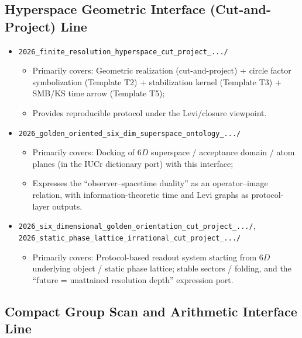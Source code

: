 \subsection{Hyperspace Geometric Interface (Cut-and-Project) Line}

\begin{itemize}
  \item \texttt{2026\_finite\_resolution\_hyperspace\_cut\_project\_.../}
  \begin{itemize}
    \item Primarily covers: Geometric realization (cut-and-project) + circle factor symbolization (Template T2) + stabilization kernel (Template T3) + SMB/KS time arrow (Template T5);
    \item Provides reproducible protocol under the Levi/closure viewpoint.
  \end{itemize}

  \item \texttt{2026\_golden\_oriented\_six\_dim\_superspace\_ontology\_.../}
  \begin{itemize}
    \item Primarily covers: Docking of $6D$ superspace / acceptance domain / atom planes (in the IUCr dictionary port) with this interface;
    \item Expresses the ``observer--spacetime duality'' as an operator--image relation, with information-theoretic time and Levi graphs as protocol-layer outputs.
  \end{itemize}

  \item \texttt{2026\_six\_dimensional\_golden\_orientation\_cut\_project\_.../},
  \texttt{2026\_static\_phase\_lattice\_irrational\_cut\_project\_.../}
  \begin{itemize}
    \item Primarily covers: Protocol-based readout system starting from $6D$ underlying object / static phase lattice; stable sectors / folding, and the ``future = unattained resolution depth'' expression port.
  \end{itemize}
\end{itemize}

\subsection{Compact Group Scan and Arithmetic Interface Line}

